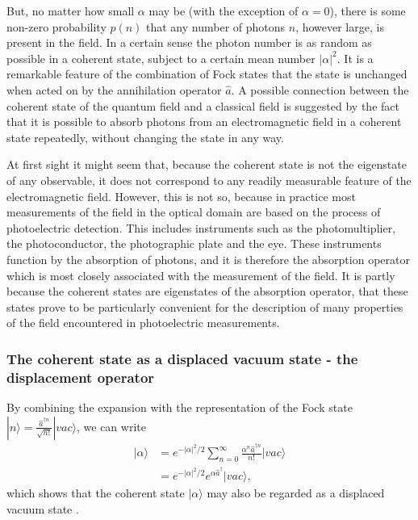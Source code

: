 {But, no matter how small $\alpha$ may be (with the exception of $\alpha=0$), there is some non-zero probability $p(n)$ that any number of photons $n$, however large, is present in the field. In a certain sense the photon number is as random as possible in a coherent state, subject to a certain mean number $|\alpha|^{2}$. It is a remarkable feature of the combination of Fock states that the state is unchanged when acted on by the annihilation operator $\hat{a}$. A possible connection between the coherent state of the quantum field and a classical field is suggested by the fact that it is possible to absorb photons from an electromagnetic field in a coherent state repeatedly, without changing the state in any way.}

{At first sight it might seem that, because the coherent state is not the eigenstate of any observable, it does not correspond to any readily measurable feature of the electromagnetic field. However, this is not so, because in practice most measurements of the field in the optical domain are based on the process of photoelectric detection. This includes instruments such as the photomultiplier, the photoconductor, the photographic plate and the eye. These instruments function by the absorption of photons, and it is therefore the absorption operator which is most closely associated with the measurement of the field. It is partly because the coherent states are eigenstates of the absorption operator, that these states prove to be particularly convenient for the description of many properties of the field encountered in photoelectric measurements.\cite[Chapter 11]{MandelWolf1995}

\subsubsection{The coherent state as a displaced vacuum state - the displacement operator}

By combining the expansion with the representation of the Fock state $|n\rangle = \frac{\hat{a}^{\dagger n}}{\sqrt{n!}}| vac\rangle$, we can write
\begin{align*}
|\alpha\rangle &= e^{-|\alpha|^{2}/2}\sum_{n=0}^{\infty}\frac{\alpha^{n}\hat{a}^{\dagger n}}{n!}|vac\rangle \\
&= e^{-|\alpha|^{2}/2}e^{\alpha\hat{a}^{\dagger}}|vac\rangle,
\end{align*}
which shows that the coherent state $|\alpha\rangle$ may also be regarded as a displaced vacuum state .

}
